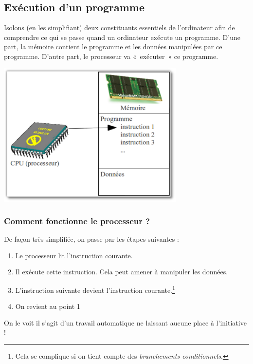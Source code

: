 	\subsection{Exécution d'un programme}

		Isolons (en les simplifiant) deux constituants essentiels de
		l'ordinateur afin de comprendre ce qui se passe quand
		un ordinateur exécute un programme. D'une part, la
		mémoire contient le programme et les données manipulées par ce
		programme. D'autre part, le processeur va «~exécuter~»
		ce programme.

		\begin{center}
		\includegraphics[width=0.7\textwidth]{image/intro-schema-ordi}
		\end{center}

	\subsubsection*{Comment fonctionne le processeur ?}

		De façon très simplifiée, on passe par les étapes suivantes :

		\begin{enumerate}
		\item Le processeur lit l'instruction courante.
		\item Il exécute cette instruction. Cela peut amener à manipuler les données.
		\item L'instruction suivante devient
			l'instruction courante.\footnote{Cela se complique si
			on tient compte des \textit{branchements conditionnels}.}
		\item On revient au point 1
		\end{enumerate}

		On le voit il s'agit d'un travail
		automatique ne laissant aucune place à l'initiative !

